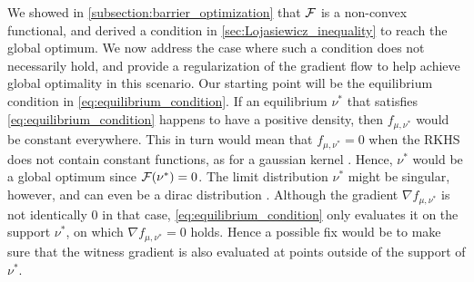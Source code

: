 We showed in \cref{subsection:barrier_optimization} that ${{\mathcal F}}$ is a non-convex functional, and derived a condition in \cref{sec:Lojasiewicz_inequality} to reach the global optimum. We now address the case where such a condition does not necessarily hold, and  provide a regularization of the gradient flow to help achieve global optimality in this scenario. Our starting point will be the equilibrium condition in \cref{eq:equilibrium_condition}. If an equilibrium $\nu^*$ that satisfies \cref{eq:equilibrium_condition} happens to have a positive density, then $f_{\mu,\nu^{*}}$ would be constant everywhere. This in turn would mean that $f_{\mu,\nu^{*}}=0$ when the RKHS does not contain constant functions, as for a gaussian kernel \cite[Corollary 4.44]{Steinwart:2008a}. Hence, $\nu^*$ would be a global optimum since ${{\mathcal F}}(\nu^{*})=0$. The limit distribution $\nu^*$  might be singular, however, and can even be a dirac distribution \cite[Theorem 6]{mei2018mean}. Although the gradient $\nabla f_{\mu,\nu^{*}}$ is not identically $0$ in that case,  \cref{eq:equilibrium_condition} only evaluates it on the support $\nu^{*}$, on which $\nabla f_{\mu,\nu^{*}}=0$ holds. Hence a possible fix would be to make sure that the witness gradient is also evaluated at points outside of the support of $\nu^{*}$. 

